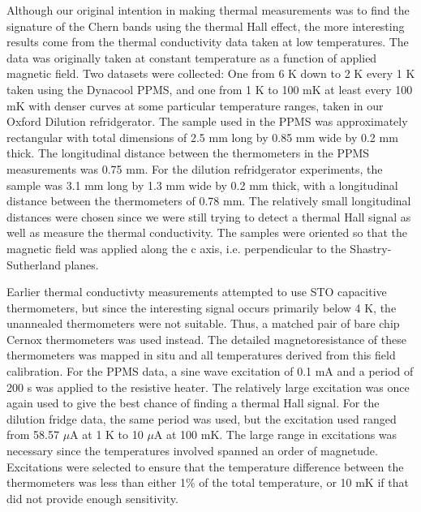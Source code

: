 \documentclass{thesis-umich}
\begin{document}
Although our original intention in making thermal measurements was to find the signature of the Chern bands using the thermal Hall effect, the more interesting results come from the thermal conductivity data taken at low temperatures. The data was originally taken at constant temperature as a function of applied magnetic field. Two datasets were collected: One from 6 K down to 2 K every 1 K taken using the Dynacool PPMS, and one from 1 K to 100 mK at least every 100 mK with denser curves at some particular temperature ranges, taken in our Oxford Dilution refridgerator. The sample used in the PPMS was approximately rectangular with total dimensions of 2.5 mm long by 0.85 mm wide by 0.2 mm thick. The longitudinal distance between the thermometers in the PPMS measurements was 0.75 mm. For the dilution refridgerator experiments, the sample was 3.1 mm long by 1.3 mm wide by 0.2 mm thick, with a longitudinal distance between the thermometers of 0.78 mm. The relatively small longitudinal distances were chosen since we were still trying to detect a thermal Hall signal as well as measure the thermal conductivity. The samples were oriented so that the magnetic field was applied along the c axis, i.e. perpendicular to the Shastry-Sutherland planes.

Earlier thermal conductivty measurements attempted to use STO capacitive thermometers, but since the interesting signal occurs primarily below 4 K, the unannealed thermometers were not suitable. Thus, a matched pair of bare chip Cernox thermometers was used instead. The detailed magnetoresistance of these thermometers was mapped in situ and all temperatures derived from this field calibration. For the PPMS data, a sine wave excitation of 0.1 mA and a period of 200 s was applied to the resistive heater. The relatively large excitation was once again used to give the best chance of finding a thermal Hall signal. For the dilution fridge data, the same period was used, but the excitation used ranged from 58.57 $\mu$A at 1 K to 10 $\mu$A at 100 mK. The large range in excitations was necessary since the temperatures involved spanned an order of magnetude. Excitations were selected to ensure that the temperature difference between the thermometers was less than either 1\% of the total temperature, or 10 mK if that did not provide enough sensitivity.
\end{document}
